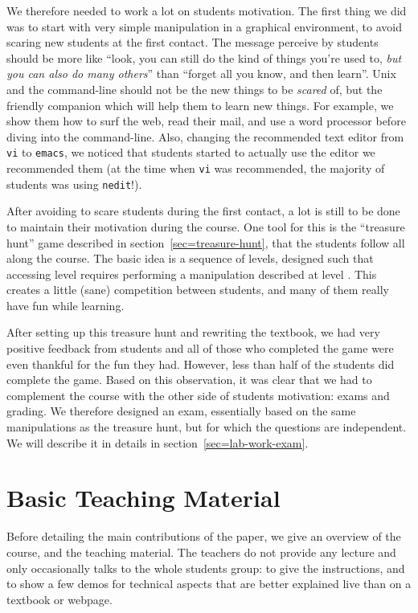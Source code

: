 \documentclass{sig-alternate}
\begin{document}
We therefore needed to work a lot on students motivation. The first
thing we did was to start with very simple manipulation in a graphical
environment, to avoid scaring new students at the first contact. The
message perceive by students should be more like ``look, you can still
do the kind of things you're used to, \emph{but you can also do many
  others}'' than ``forget all you know, and then learn''. Unix and the
command-line should not be the new things to be \emph{scared} of, but
the friendly companion which will help them to learn new things. For
example, we show them how to surf the web, read their mail, and use a
word processor before diving into the command-line. Also, changing the
recommended text editor from \texttt{vi} to \texttt{emacs}, we noticed
that students started to actually use the editor we recommended them
(at the time when \texttt{vi} was recommended, the majority of
students was using \texttt{nedit}!).

After avoiding to scare students during the first contact, a lot is
still to be done to maintain their motivation during the course. One
tool for this is the ``treasure hunt'' game described in
section~\ref{sec=treasure-hunt}, that the students follow all along
the course. The basic idea is a sequence of levels, designed such that
accessing level  requires performing a manipulation described at
level . This creates a little (sane) competition between students,
and many of them really have fun while learning.

\label{motivation-exam}
After setting up this treasure hunt and rewriting the textbook, we had
very positive feedback from students and all of those who completed the
game were even thankful for the fun they had. However, less than half
of the students did complete the game. Based on this observation, it
was clear that we had to complement the course with the other side of
students motivation: exams and grading. We therefore designed an exam,
essentially based on the same manipulations as the treasure hunt, but
for which the questions are independent. We will describe it in
details in section~\ref{sec=lab-work-exam}.

\section{Basic Teaching Material}
\label{sec=material}

Before detailing the main contributions of the paper, we give an
overview of the course, and the teaching material.
The teachers do
not provide any lecture and only occasionally talks to the whole
students group: to give the instructions, and to show a few demos for
technical aspects that are better explained live than on a textbook or
webpage.
\end{document}
